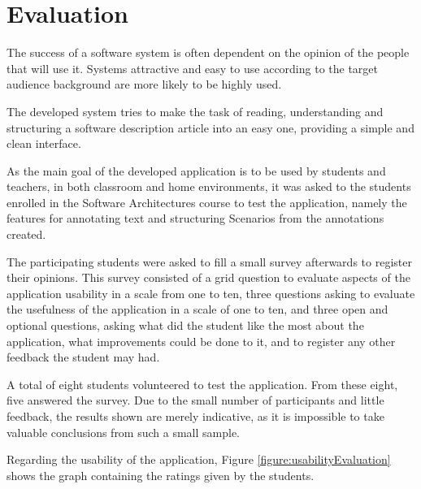 
\chapter{Evaluation}
\label{chapter:evaluation}

The success of a software system is often dependent on the opinion of the people that will use it. Systems attractive and easy to use according to the target audience background are more likely to be highly used.

The developed system tries to make the task of reading, understanding and structuring a software description article into an easy one, providing a simple and clean interface.

As the main goal of the developed application is to be used by students and teachers, in both classroom and home environments, it was asked to the students enrolled in the Software Architectures course to test the application, namely the features for annotating text and structuring Scenarios from the annotations created.

The participating students were asked to fill a small survey afterwards to register their opinions.
This survey consisted of a grid question to evaluate aspects of the application usability in a scale from one to ten, three questions asking to evaluate the usefulness of the application in a scale of one to ten, and three open and optional questions, asking what did the student like the most about the application, what improvements could be done to it, and to register any other feedback the student may had.

A total of eight students volunteered to test the application. From these eight, five answered the survey. Due to the small number of participants and little feedback, the results shown are merely indicative, as it is impossible to take valuable conclusions from such a small sample.

Regarding the usability of the application, Figure \ref{figure:usabilityEvaluation} shows the graph containing the ratings given by the students.


